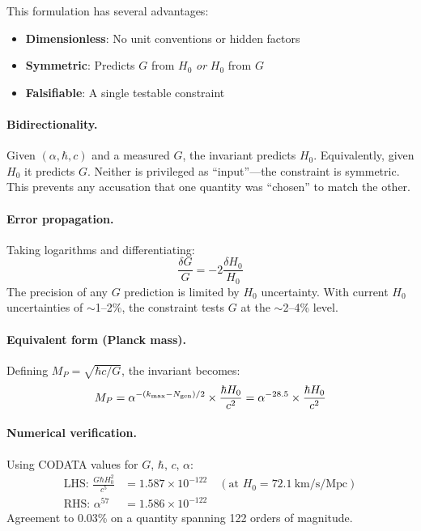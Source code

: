 This formulation has several advantages:
\begin{itemize}
\item \textbf{Dimensionless}: No unit conventions or hidden factors
\item \textbf{Symmetric}: Predicts $G$ from $H_0$ \textit{or} $H_0$ from $G$
\item \textbf{Falsifiable}: A single testable constraint
\end{itemize}

\paragraph{Bidirectionality.}
Given $(\alpha, \hbar, c)$ and a measured $G$, the invariant predicts $H_0$. Equivalently, given $H_0$ it predicts $G$. Neither is privileged as ``input''---the constraint is symmetric. This prevents any accusation that one quantity was ``chosen'' to match the other.

\paragraph{Error propagation.}
Taking logarithms and differentiating:
\begin{equation}
\frac{\delta G}{G} = -2\frac{\delta H_0}{H_0}
\label{eq:error-prop}
\end{equation}
The precision of any $G$ prediction is limited by $H_0$ uncertainty. With current $H_0$ uncertainties of $\sim$1--2\%, the constraint tests $G$ at the $\sim$2--4\% level.

\paragraph{Equivalent form (Planck mass).}
Defining $M_P = \sqrt{\hbar c/G}$, the invariant becomes:
\begin{equation}
M_P = \alpha^{-(k_{\max} - N_{\rm gen})/2} \times \frac{\hbar H_0}{c^2} = \alpha^{-28.5} \times \frac{\hbar H_0}{c^2}
\label{eq:MP-master}
\end{equation}

\paragraph{Numerical verification.}
Using CODATA values for $G$, $\hbar$, $c$, $\alpha$:
\begin{align}
\text{LHS: } \frac{G\hbar H_0^2}{c^5} &= 1.587 \times 10^{-122} \quad (\text{at } H_0 = 72.1~\text{km/s/Mpc}) \nonumber\\
\text{RHS: } \alpha^{57} &= 1.586 \times 10^{-122}
\end{align}
Agreement to 0.03\% on a quantity spanning 122 orders of magnitude.

